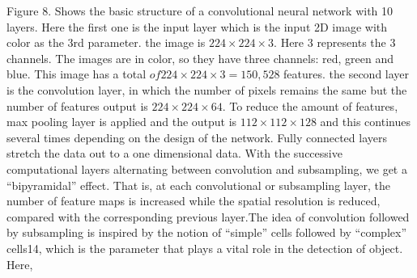 \documentclass[12pt]{article}
\begin{document}
    Figure 8. Shows the basic structure of a convolutional neural network with 10 layers. Here the first one is the input layer which is the input 2D image with color as the 3rd parameter. the image is $224\times224\times3$. Here 3 represents the 3 channels. The images are in color, so they have three channels: red, green and blue. This image has a total $of 224\times224\times3 = 150,528$ features. the second layer is the convolution layer, in which the number of pixels remains the same but the number of features output is $224\times224\times64$. To reduce the amount of features, max pooling layer is applied and the output is $112\times112\times128$ and this continues several times depending on the design of the network. Fully connected layers stretch the data out to a one dimensional data. With the successive computational layers alternating between convolution and subsampling, we get a “bipyramidal” effect. That is, at each convolutional or subsampling layer, the number of feature maps is increased while the spatial resolution is reduced, compared with the corresponding previous layer.The idea of convolution followed by subsampling is inspired by the notion of “simple” cells followed by “complex” cells14, which is the parameter that plays a vital role in the detection of object. Here, 
\end{document}
